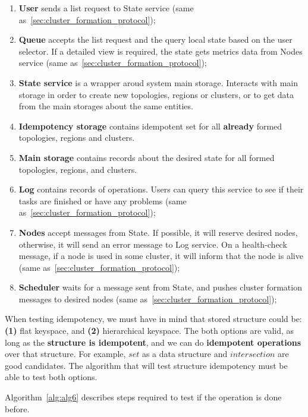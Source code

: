 \begin{enumerate}[start=1,label={(\bfseries \arabic*)}]
	\item \textbf{User} sends a list request to State service (same as~\ref{sec:cluster_formation_protocol});
	\item \textbf{Queue} accepts the list request and the query local state based on the user selector. If a detailed view is required, the state gets metrics data from Nodes service (same as~\ref{sec:cluster_formation_protocol});
	\item \textbf{State service} is a wrapper aroud system main storage. Interacts with main storage in order to create new topologies, regions or clusters, or to get data from the main storages about the same entities. 
	\item \textbf{Idempotency storage} contains idempotent set for all \textbf{already} formed topologies, regions and clusters.
	\item \textbf{Main storage} contains records about the desired state for all formed topologies, regions, and clusters.
	\item \textbf{Log} contains records of operations. Users can query this service to see if their tasks are finished or have any problems (same as~\ref{sec:cluster_formation_protocol});
	\item \textbf{Nodes} accept messages from State. If possible, it will reserve desired nodes, otherwise, it will send an error message to Log service. On a health-check message, if a node is used in some cluster, it will inform that the node is alive (same as~\ref{sec:cluster_formation_protocol});
	\item \textbf{Scheduler} waits for a message sent from State, and pushes cluster formation messages to desired nodes (same as~\ref{sec:cluster_formation_protocol});
\end{enumerate}

\noindent
When testing idempotency, we must have in mind that stored structure could be: \textbf{(1)} flat keyspace, and \textbf{(2)} hierarchical keyspace. The both options are valid, as long as the \textbf{structure is idempotent}, and we can do \textbf{idempotent operations} over that structure. For example, $set$ as a data structure and $intersection$ are good candidates. The algorithm that will test structure idempotency must be able to test both options. 

Algorithm~\ref{alg:alg6} describes steps required to test if the operation is done before.

